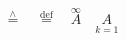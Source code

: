 \documentclass{book}
\begin{document}
\begin{equation*}
\stackrel{\wedge}{=}\quad\stackrel{\mathrm
{def}}{=}\quad\overset{\infty}{A}\quad
\underset{k=1}{A}
\end{equation*}
\end{document}
